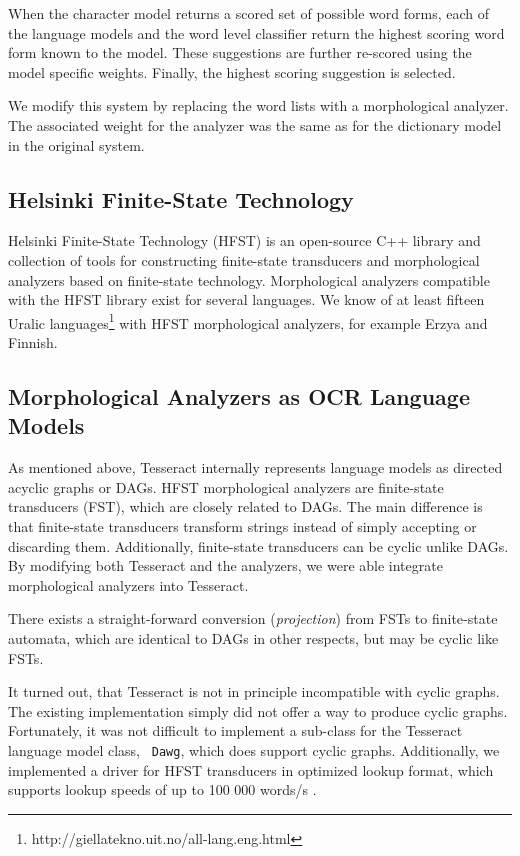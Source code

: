 \documentclass[b5paper]{article}
\begin{document}
When the character model returns a scored set of possible word forms,
each of the language models and the word level classifier return the
highest scoring word form known to the model. These suggestions are
further re-scored using the model specific weights. Finally, the highest
scoring suggestion is selected.

We modify this system by replacing the word lists with a morphological
analyzer. The associated weight for the analyzer was the same as for
the dictionary model in the original system.

\subsection{Helsinki Finite-State Technology}
Helsinki Finite-State Technology (HFST) \cite{linden13} is an
open-source C++ library and collection of tools for constructing
finite-state transducers and morphological analyzers based on
finite-state technology. Morphological analyzers compatible with the
HFST library exist for several languages. We know of at least fifteen
Uralic languages\footnote{http://giellatekno.uit.no/all-lang.eng.html}
with HFST morphological analyzers, for example Erzya and Finnish.

\subsection{Morphological Analyzers as OCR Language Models}
As mentioned above, Tesseract internally represents language models as
directed acyclic graphs or DAGs. HFST morphological analyzers are
finite-state transducers (FST), which are closely related to DAGs. The
main difference is that finite-state transducers transform strings
instead of simply accepting or discarding them. Additionally,
finite-state transducers can be cyclic unlike DAGs. By modifying both
Tesseract and the analyzers, we were able integrate morphological
analyzers into Tesseract.

There exists a straight-forward conversion ({\it projection})
from FSTs to finite-state automata, which are identical to DAGs in
other respects, but may be cyclic like FSTs. 

It turned out, that Tesseract is not in principle incompatible with
cyclic graphs. The existing implementation simply did not offer a way
to produce cyclic graphs. Fortunately, it was not difficult to
implement a sub-class for the Tesseract language model class, {\tt
  Dawg}, which does support cyclic graphs. Additionally, we implemented a
driver for HFST transducers in optimized lookup format, which supports
lookup speeds of up to 100 000 words/s \cite{silfverberg09}.
\end{document}
